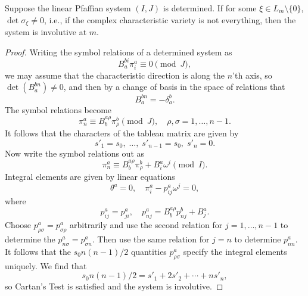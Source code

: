 \begin{prop}
    Suppose the linear Pfaffian system $(I,J)$ is determined. If for some $\xi\in L_m\setminus\{0\}$, $\det\sigma_\xi\neq 0$, i.e., if the complex characteristic variety is not everything, then the system is involutive at $m$.  
\end{prop}
\begin{proof}
    Writing the symbol relations of a determined system as 
    \[B^{bi}_a\pi^a_i\equiv 0\pmod{J},\]
    we may assume that the characteristic direction is along the $n$'th axis, so $\det\left(B^{bn}_a\right)\neq 0$, and then by a change of basis in the space of relations that 
    \[B^{bn}_a=-\delta^b_a.\]
    The symbol relations become 
    \[\pi^a_n\equiv B^{a\rho }_b\pi^b_\rho\pmod{J},\quad \rho,\sigma=1,\ldots,n-1.\]
    It follows that the characters of the tableau matrix are given by 
    \[s'_1=s_0,\;\ldots,\;s'_{n-1}=s_0,\;s'_n=0.\]
    Now write the symbol relations out as 
    \[\pi^a_n\equiv B^{a\rho }_b \pi^b_\rho +B^a_i\omega^i\pmod{I}.\]
    Integral elements are given by linear equations 
    \[\theta^a=0,\quad \pi^a_i-p^a_{ij}\omega^j=0,\]
    where 
    \[p^a_{ij}=p^a_{ji},\quad p^a_{nj}=B^{a\rho}_bp^b_{nj}+B^a_j.\]
    Choose $p^a_{\rho\sigma}=p^a_{\sigma\rho}$ arbitrarily and use the second relation for $j=1,\ldots,n-1$ to determine the $p^a_{n\sigma}=p^a_{\sigma n}$. Then use the same relation for $j=n$ to determine $p^a_{nn}$. It follows that the $s_0n(n-1)/2$  quantities $p^a_{\rho\sigma}$ specify the integral elements uniquely. We find that 
    \[s_0n(n-1)/2=s'_1+2s'_2+\cdots+ns'_n,\]
    so Cartan's Test is satisfied and the system is involutive.
\end{proof}



